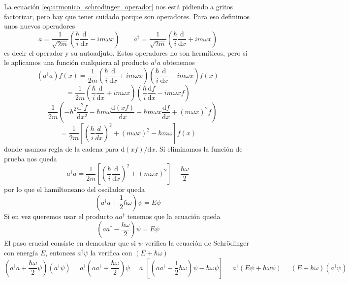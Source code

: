 La ecuación \ref{eq:armonico_schrodinger_operador} nos está pidiendo a gritos factorizar, pero hay que tener cuidado porque son operadores.
Para eso definimos unos nuevos operadores
\begin{equation}
    a = \frac{1}{\sqrt{2m}} \left(\frac{\hbar}{i} \frac{\mathrm{d}}{\mathrm{d}x} - i m \omega x\right) \qquad 
    a^{\dagger} = \frac{1}{\sqrt{2m}} \left(\frac{\hbar}{i} \frac{\mathrm{d}}{\mathrm{d}x} + i m \omega x\right)
\end{equation}
es decir el operador y su autoadjuto.
Estos operadores no son hermíticos, pero si le aplicamos una función cualquiera al producto $a^{\dagger}a$ obtenemos
\[ (a^{\dagger}a) f(x) =  \frac{1}{2m} \left(\frac{\hbar}{i} \frac{\mathrm{d}}{\mathrm{d}x} + i m \omega x\right) \left(\frac{\hbar}{i} \frac{\mathrm{d}}{\mathrm{d}x} - i m \omega x\right) f(x)\]
\[ =  \frac{1}{2m} \left(\frac{\hbar}{i} \frac{\mathrm{d}}{\mathrm{d}x} + i m \omega x\right) \left(\frac{\hbar}{i} \frac{\mathrm{d} f}{\mathrm{d}x} - i m \omega x f\right) \]
\[ =  \frac{1}{2m} \left(- \hbar^2 \frac{\mathrm{d}^2 f}{\mathrm{d}x^2} - \hbar m \omega \frac{\mathrm{d} (x f)}{\mathrm{d}x} + \hbar m  \omega x \frac{\mathrm{d}f}{\mathrm{d}x} + (m \omega x)^2 f\right) \]
\[ = \frac{1}{2m} \left[ \left(\frac{\hbar}{i} \frac{d}{dx}\right)^2 + (m \omega x)^2 - \hbar m \omega\right] f(x) \]
donde usamos regla de la cadena para $\mathrm{d}(x f)/\mathrm{d}x$.
Si eliminamos la función de prueba nos queda
\begin{equation}
    a^{\dagger} a = \frac{1}{2m} \left[\left(\frac{\hbar}{i} \frac{\mathrm{d}}{\mathrm{d}x}\right)^2 + (m \omega x)^2\right] - \frac{\hbar \omega}{2}
\end{equation}
por lo que el hamiltoneano del oscilador queda
\begin{equation}
    (a^{\dagger}a + \frac{1}{2}\hbar \omega) \psi = E \psi
\end{equation}
Si en vez queremos usar el producto $a a^\dagger$ tenemos que la ecuación queda
\begin{equation}
    \left(a a^{\dagger} - \frac{\hbar \omega}{2} \right)\psi = E \psi
\end{equation}
El paso crucial consiste en demostrar que si $\psi$ verifica la ecuación de Schrödinger con energía $E$, entonces $a^{\dagger} \psi$ la verifica con $(E + \hbar \omega)$
\[ (a^{\dagger} a + \frac{\hbar\omega}{2} \psi) (a^{\dagger} \psi) = a^{\dagger} (a a^{\dagger} + \frac{\hbar\omega}{2}) \psi = a^{\dagger} \left[\left(a a^\dagger - \frac{1}{2}\hbar \omega \right)\psi - \hbar \omega \psi \right] = a^{\dagger} (E \psi + \hbar\omega \psi) = (E + \hbar \omega)(a^{\dagger}\psi) \]

